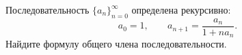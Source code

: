 \documentclass{article}
\begin{document}
Последовательность $\{a_n\}_{n=0}^\infty$ определена рекурсивно:
$$a_0=1, \;\;\;\;\;\;\; a_{n+1} = \frac{a_n}{1 + na_n}.$$
Найдите формулу общего члена последовательности.
\end{document}
